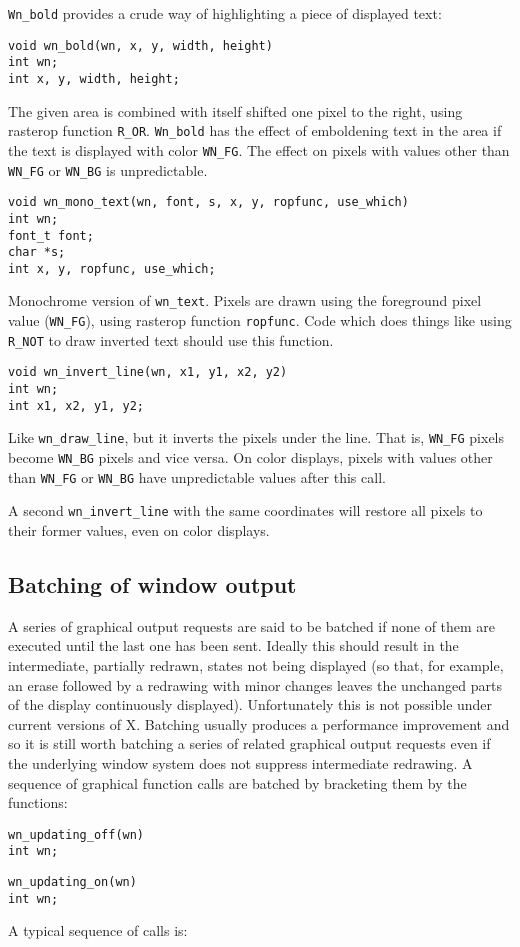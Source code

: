{\tt Wn\_bold} provides a crude way of highlighting a piece of displayed text:
\begin{verbatim}
void wn_bold(wn, x, y, width, height)
int wn;
int x, y, width, height;
\end{verbatim}
The given area is combined with itself shifted one pixel to the right,
using rasterop function {\tt R\_OR}.
{\tt Wn\_bold} has the effect of emboldening text in the area if the text is displayed
with color {\tt WN\_FG}.
The effect on pixels with values other than {\tt WN\_FG} or {\tt WN\_BG} is
unpredictable.
\begin{verbatim}
void wn_mono_text(wn, font, s, x, y, ropfunc, use_which)
int wn;
font_t font;
char *s;
int x, y, ropfunc, use_which;
\end{verbatim}
Monochrome version of {\tt wn\_text}.
Pixels are drawn using the foreground pixel value ({\tt WN\_FG}),
using rasterop function {\tt ropfunc}.
Code which does things like using {\tt R\_NOT} to draw inverted text should
use this function.
\begin{verbatim}
void wn_invert_line(wn, x1, y1, x2, y2)
int wn;
int x1, x2, y1, y2;
\end{verbatim}
Like {\tt wn\_draw\_line}, but it inverts the pixels under the line.
That is, {\tt WN\_FG} pixels become {\tt WN\_BG} pixels and vice versa.
On color displays, pixels with values other than {\tt WN\_FG} or
{\tt WN\_BG} have unpredictable values after this call.

A second {\tt wn\_invert\_line} with the same coordinates will restore all
pixels to their former values, even on color displays.

\subsection{Batching of window output}
A series of graphical output requests are said to be batched
if none of them are executed until the last one has been sent.
Ideally this should result in the intermediate, partially
redrawn, states not being displayed (so that, for example, an erase followed by
a redrawing with minor changes leaves the unchanged parts of the display
continuously displayed).
Unfortunately this is not possible under current versions of X.
Batching usually produces a performance improvement
and so it is still worth batching a series of related graphical
output requests even if the underlying window system does not suppress intermediate
redrawing.
A sequence of graphical function calls are batched by bracketing
them by the functions:
\label{wn_updating_off}
\begin{verbatim}
wn_updating_off(wn)
int wn;
\end{verbatim}
\begin{verbatim}
wn_updating_on(wn)
int wn;
\end{verbatim}
A typical sequence of calls is:

